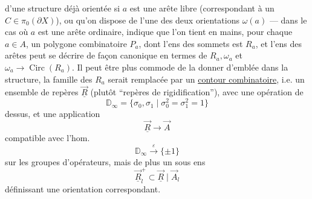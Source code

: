 
d'une structure déjà orientée si $a$ est une arête libre (correspondant à un $C\in\pi_0(\partial X)$), ou qu'on dispose de l'une des deux orientations $\omega(a)$ --- dans le cas où $a$ est une arête ordinaire, indique que l'on tient en mains, pour chaque $a\in A$, un polygone combinatoire $P_a$, dont l'ens des sommets est $R_a$, et l'ens des arêtes peut se décrire  de façon canonique en termes de $R_a,\omega_a$ et $\omega_a\longrightarrow\operatorname{Circ}(R_a)$.
Il peut être plus commode de la donner d'emblée dans la structure,  la famille des $R_a$ serait remplacée par un
\uline{contour combinatoire}, i.e. un ensemble de repères $\vec{\underline R}$ (plutôt ``repères de rigidification''), avec une opération de
\[
 \mathbb D_\infty=\{\sigma_0,\sigma_1\mid\sigma_0^2=\sigma_1^2=1\}
\]
dessus, et une application
\[
 \vec{\underline R}\longrightarrow\vec A
\]
compatible avec l'hom.
\[
 \mathbb D_\infty\xrightarrow{\varepsilon}\{\pm1\}
\]
sur les groupes d'opérateurs, mais de plus un sous ens
\[
 \vec{\underline R}_l^+\subset\vec{\underline R}\mid\vec A_l
\]
définissant une orientation  correspondant.
